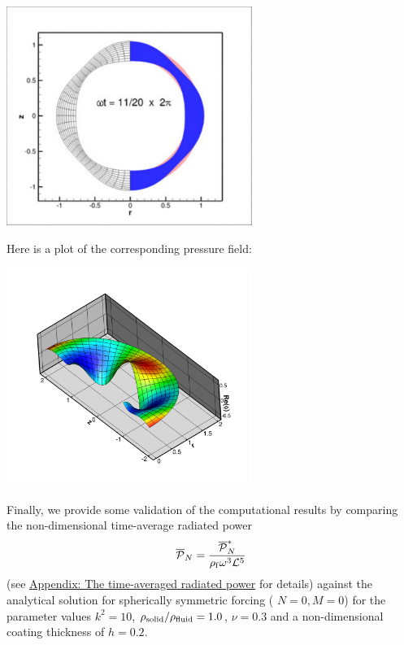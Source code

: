  
\begin{DoxyImage}
\includegraphics[width=0.6\textwidth]{anim}
\end{DoxyImage}


Here is a plot of the corresponding pressure field\+:

 
\begin{DoxyImage}
\includegraphics[width=0.6\textwidth]{potential}
\end{DoxyImage}


Finally, we provide some validation of the computational results by comparing the non-\/dimensional time-\/average radiated power \[ \overline{\cal P }_N = \frac{\overline{\cal P }^*_N}{\rho_{\rm f} \omega^3 {\cal L}^5} \] (see \hyperlink{index_appendix}{Appendix\+: The time-\/averaged radiated power} for details) against the analytical solution for spherically symmetric forcing ( $ N=0, M=0 $) for the parameter values $ k^2 = 10 $, $ \rho_{\rm solid}/\rho_{\rm fluid} =1.0 $, $ \nu =0.3 $ and a non-\/dimensional coating thickness of $ h = 0.2. $

